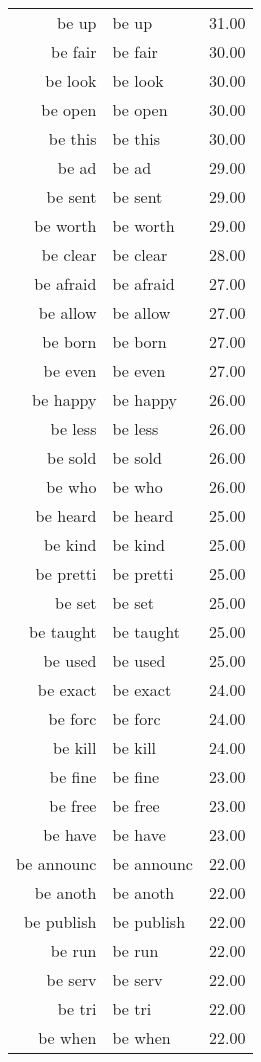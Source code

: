 \begin{table}[ht]
\begin{tabular}{rlr}
  be up & be up & 31.00 \\ 
  be fair & be fair & 30.00 \\ 
  be look & be look & 30.00 \\ 
  be open & be open & 30.00 \\ 
  be this & be this & 30.00 \\ 
  be ad & be ad & 29.00 \\ 
  be sent & be sent & 29.00 \\ 
  be worth & be worth & 29.00 \\ 
  be clear & be clear & 28.00 \\ 
  be afraid & be afraid & 27.00 \\ 
  be allow & be allow & 27.00 \\ 
  be born & be born & 27.00 \\ 
  be even & be even & 27.00 \\ 
  be happy & be happy & 26.00 \\ 
  be less & be less & 26.00 \\ 
  be sold & be sold & 26.00 \\ 
  be who & be who & 26.00 \\ 
  be heard & be heard & 25.00 \\ 
  be kind & be kind & 25.00 \\ 
  be pretti & be pretti & 25.00 \\ 
  be set & be set & 25.00 \\ 
  be taught & be taught & 25.00 \\ 
  be used & be used & 25.00 \\ 
  be exact & be exact & 24.00 \\ 
  be forc & be forc & 24.00 \\ 
  be kill & be kill & 24.00 \\ 
  be fine & be fine & 23.00 \\ 
  be free & be free & 23.00 \\ 
  be have & be have & 23.00 \\ 
  be announc & be announc & 22.00 \\ 
  be anoth & be anoth & 22.00 \\ 
  be publish & be publish & 22.00 \\ 
  be run & be run & 22.00 \\ 
  be serv & be serv & 22.00 \\ 
  be tri & be tri & 22.00 \\ 
  be when & be when & 22.00 \\ 

\end{tabular}
\end{table}
